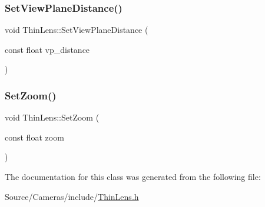 \subsubsection{\texorpdfstring{Set\+View\+Plane\+Distance()}{SetViewPlaneDistance()}}
{\footnotesize\ttfamily void Thin\+Lens\+::\+Set\+View\+Plane\+Distance (\begin{DoxyParamCaption}\item[{const float}]{vp\+\_\+distance }\end{DoxyParamCaption})\hspace{0.3cm}{\ttfamily [inline]}}

\hypertarget{class_thin_lens_a10121e3990c0a9bf61394440d2e85421}{}\label{class_thin_lens_a10121e3990c0a9bf61394440d2e85421} 
\subsubsection{\texorpdfstring{Set\+Zoom()}{SetZoom()}}
{\footnotesize\ttfamily void Thin\+Lens\+::\+Set\+Zoom (\begin{DoxyParamCaption}\item[{const float}]{zoom }\end{DoxyParamCaption})\hspace{0.3cm}{\ttfamily [inline]}}



The documentation for this class was generated from the following file\+:\begin{DoxyCompactItemize}
\item 
Source/\+Cameras/include/\hyperlink{_thin_lens_8h}{Thin\+Lens.\+h}\end{DoxyCompactItemize}

